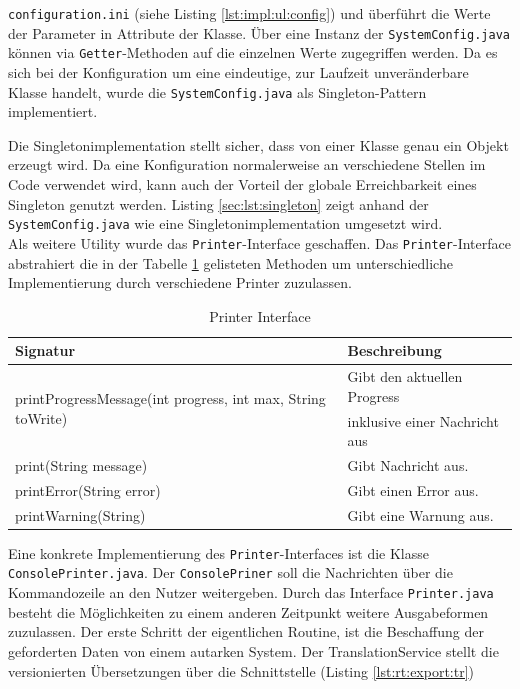 \documentclass[10pt, oneside, ngerman]{article}
\begin{document}
    \lstinline{configuration.ini} (siehe Listing \ref{lst:impl:ul:config}) und überführt die Werte der Parameter in Attribute der Klasse. Über eine Instanz
    der \lstinline{SystemConfig.java} können via \lstinline{Getter}-Methoden auf die einzelnen Werte zugegriffen werden. Da es sich bei der Konfiguration um eine 
    eindeutige, zur Laufzeit unveränderbare Klasse handelt, wurde die \lstinline{SystemConfig.java} als Singleton-Pattern implementiert.\par Die Singletonimplementation stellt sicher, dass 
    von einer Klasse genau ein Objekt erzeugt wird. Da eine Konfiguration normalerweise an verschiedene Stellen im Code verwendet wird, kann auch der Vorteil der globale Erreichbarkeit 
    eines Singleton genutzt werden. Listing \ref{sec:lst:singleton} zeigt anhand der \lstinline{SystemConfig.java} wie eine Singletonimplementation umgesetzt wird.\\
    Als weitere Utility wurde das \lstinline{Printer}-Interface geschaffen. Das \lstinline{Printer}-Interface abstrahiert die in der Tabelle \ref{tab:impl:tu:output} gelisteten Methoden um unterschiedliche Implementierung durch verschiedene Printer zuzulassen.
    \begin{table}[ht]
      \centering
      \begin{tabular}{l l}
        \hline
        \rowcolor{carolinablue}
        Signatur & Beschreibung \\
        \hline
        \multirow{2}{*}{printProgressMessage(int progress, int max, String toWrite)} & Gibt den aktuellen Progress \\ & inklusive einer Nachricht aus\\
        \rowcolor{lightgray}
        print(String message) & Gibt Nachricht aus.\\
        printError(String error) & Gibt einen Error aus.\\
        \rowcolor{lightgray}
        printWarning(String) & Gibt eine Warnung aus.
      \end{tabular}
      \caption{Printer Interface}
      \label{tab:impl:tu:output}
    \end{table}
    Eine konkrete Implementierung des \lstinline{Printer}-Interfaces ist die Klasse \lstinline{ConsolePrinter.java}. Der \lstinline{ConsolePriner} soll die Nachrichten über
    die Kommandozeile an den Nutzer weitergeben. Durch das Interface \lstinline{Printer.java} besteht die Möglichkeiten zu einem anderen Zeitpunkt weitere Ausgabeformen zuzulassen.
    Der erste Schritt der eigentlichen Routine, ist die Beschaffung der geforderten Daten von einem autarken System. Der TranslationService stellt die versionierten Übersetzungen über die Schnittstelle (Listing \ref{lst:rt:export:tr})
\end{document}
